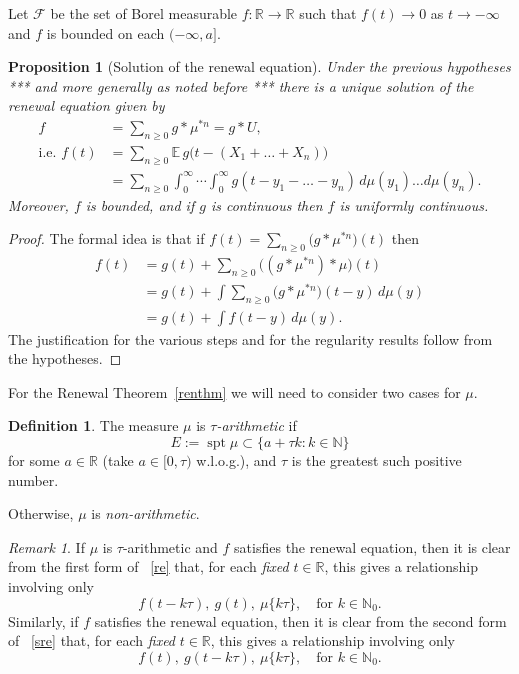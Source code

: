 \documentclass[a4paper]{amsart}
\theoremstyle{plain}
\newtheorem{proposition}[theorem]{Proposition}
\theoremstyle{definition}
\newtheorem{definition}[theorem]{Definition}%
\theoremstyle{remark}
\newtheorem{remark}[theorem]{Remark}
\DeclareMathOperator{\spt}{spt}
\begin{document}
Let $ \mathcal{F} $ be the set of Borel measurable $ f : \mathbb{R} \to \mathbb{R} $ such that $ f(t) \to 0 $ as $ t \to -\infty $ and $ f $ is bounded on each $ (-\infty, a ] $.

  \begin{proposition}[Solution of the renewal equation]\label{solre}
  Under the previous hypotheses *** and more generally as noted before ***  there is a unique solution of the renewal equation given by
  \begin{equation} \label{sre}
  \begin{aligned}
  f &= \sum_{n\geq 0} g * \mu^{*n} = g*U,\\
  \text{i.e.\ } f(t) &= \sum_{n\geq 0} \mathbb{E} \, g \big ( t - ( X_1 + \dots + X_n) \big) \\
  &= \sum_{n\geq 0} \int_0^\infty \cdots \int_0^\infty g(t - y_1 - \dots - y_n) \, d\mu(y_1)\ldots d\mu(y_n).
  \end{aligned} 
  \end{equation}
 Moreover, $ f $ is bounded, and if $ g $ is continuous then $ f $ is uniformly continuous.  
  \end{proposition} 
  
 \begin{proof} The formal idea is that if $ f(t) =  \sum_{n\geq 0} \big(g * \mu^{*n}\big) (t) $ then
  \begin{align*}
  f(t) &= g(t) + \sum_{n\geq 0} \big( ( g * \mu^{*n})*\mu \big) (t) \\
  &= g(t) + \int \sum_{n\geq 0} \big( g * \mu^{*n} \big) (t-y) \, d\mu(y) \\
  &= g(t) + \int f(t-y)\, d\mu(y).
  \end{align*} 
 The justification for the various steps and for the regularity results  follow from the hypotheses. 
  \end{proof} 
  
  For the  Renewal Theorem~\ref{renthm}             we will need to consider two cases for $ \mu $.
  
  \begin{definition} The measure $ \mu $ is \emph{$ \tau $-arithmetic} if 
  \[
   E:= \spt \mu \subset \{ a + \tau k : k \in \mathbb{N} \}
   \]
   for some $ a \in \mathbb{R} $ (take $ a\in [0,\tau) $ w.l.o.g.), and $ \tau $ is the greatest such positive number.
   
   Otherwise, $ \mu $ is \emph{non-arithmetic}.
 \end{definition}  
  
\begin{remark} \label{fdep} If $ \mu $ is $ \tau $-arithmetic and $ f $ satisfies the renewal equation, then it is clear from the first form of ~\eqref{re} that, for each \emph{fixed} $ t \in \mathbb{R} $, this gives a relationship involving only   
\[
f(t-k \tau),\ g(t), \ \mu\{k\tau\}, \quad \text{for } k \in \mathbb{N} _0.
\] 
Similarly, if $ f $ satisfies the renewal equation,  then it is clear from the second form of ~\eqref{sre} that, for each \emph{fixed} $ t \in \mathbb{R} $, this gives a relationship involving only   
\[
f(t),\ g(t-k \tau), \ \mu\{k\tau\}, \quad \text{for } k \in \mathbb{N} _0.   
\] 
  \end{remark} 
  
\end{document}
